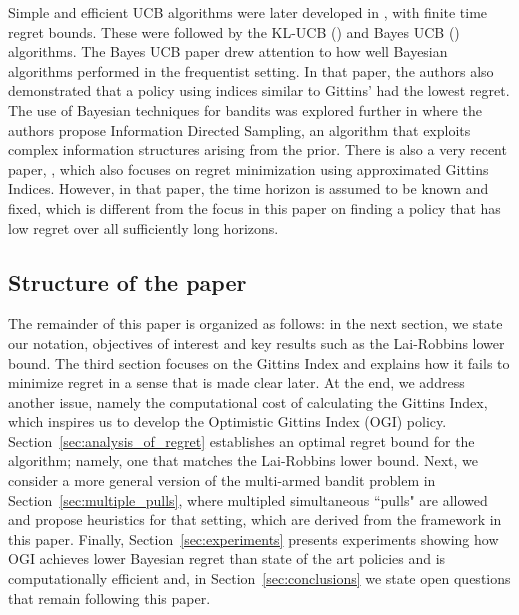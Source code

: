 Simple and  efficient UCB algorithms were later developed in \cite{agrawal1995sample,auer2002finite}, with finite time regret bounds. These were followed by the KL-UCB (\cite{garivier2011kl}) and Bayes UCB (\cite{kaufmann2012thompson}) algorithms. The Bayes UCB paper drew attention to how well Bayesian algorithms performed in the frequentist setting. In that paper, the authors also demonstrated that a policy using indices similar to Gittins' had the lowest regret. The use of Bayesian techniques for bandits was explored further in \cite{russo2014learning} where the authors propose Information Directed Sampling, an algorithm that exploits complex information structures arising from the prior. There is also a very recent paper, \cite{lattimore2016regret}, which also focuses on regret minimization using approximated Gittins Indices. However, in that paper, the time horizon is assumed to be known and fixed, which is different from the focus in this paper on finding a policy that has low regret over all sufficiently long horizons.

\subsection{Structure of the paper}
The remainder of this paper is organized as follows: in the next section, we state our notation, objectives of interest 
and key results such as the Lai-Robbins lower bound. The third section focuses on the Gittins Index and explains how it fails to minimize regret in a sense that is made clear later. At the end, we address another issue, namely the computational cost of calculating the Gittins Index, which inspires us to develop the Optimistic Gittins Index (OGI) policy. Section~\ref{sec:analysis_of_regret} establishes an optimal regret bound for the algorithm; namely, one that matches the Lai-Robbins lower bound. Next, we consider a more general version of the multi-armed bandit problem in Section~\ref{sec:multiple_pulls}, where multipled simultaneous ``pulls" are allowed and propose heuristics for that setting, which are derived from the framework in this paper. Finally, Section~\ref{sec:experiments} presents experiments showing how OGI achieves lower Bayesian regret than state of the art policies and is computationally efficient and, in Section~\ref{sec:conclusions} we state open questions that remain following this paper.